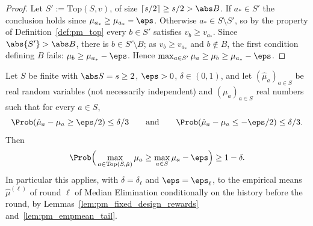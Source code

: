 \begin{proof}
\leanok
{}
Let $S' := \mathrm{Top}(S,v)$, of size $\lceil s/2\rceil\ge s/2>\abs B$. If $a_*\in S'$ the
conclusion holds since $\mu_{a_*}\ge\mu_{a_*}-\eps$. Otherwise $a_*\in S\setminus S'$, so by the
property of Definition~\ref{def:pm_top} every $b\in S'$ satisfies $v_b\ge v_{a_*}$. Since
$\abs{S'}>\abs B$, there is $b\in S'\setminus B$; as $v_b\ge v_{a_*}$ and $b\notin B$, the first
condition defining $B$ fails: $\mu_b\ge\mu_{a_*}-\eps$. Hence $\max_{a\in S'}\mu_a\ge\mu_b\ge\mu_{a_*}-\eps$.
\end{proof}

\begin{lemma}\label{lem:me_round}
\leanok
{}
Let $S$ be finite with $\abs S = s\ge2$, $\eps>0$, $\delta\in(0,1)$, and let $(\hat\mu_a)_{a\in S}$
be real random variables (not necessarily independent) and $(\mu_a)_{a\in S}$ real numbers such
that for every $a\in S$,
\[
  \Prob(\hat\mu_a-\mu_a\ge\eps/2)\le\delta/3\qquad\text{and}\qquad\Prob(\hat\mu_a-\mu_a\le-\eps/2)\le\delta/3 .
\]
Then
\[
  \Prob\Big(\max_{a\in\mathrm{Top}(S,\hat\mu)}\mu_a\ge\max_{a\in S}\mu_a-\eps\Big)\ge1-\delta .
\]
In particular this applies, with $\delta = \delta_\ell$ and $\eps = \eps_\ell$, to the empirical
means $\hat\mu^{(\ell)}$ of round $\ell$ of Median Elimination conditionally on the history
before the round, by Lemmas~\ref{lem:pm_fixed_design_rewards} and~\ref{lem:pm_empmean_tail}.
\end{lemma}

